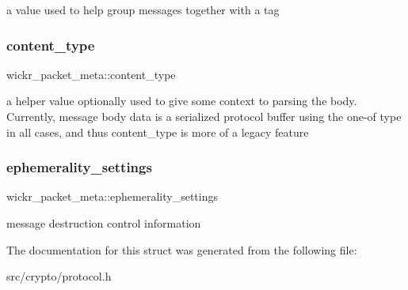 a value used to help group messages together with a tag \mbox{\label{structwickr__packet__meta_ada659f7c31d257c76edab5db52973f6e}} 
\subsubsection{\texorpdfstring{content\+\_\+type}{content\_type}}
{\footnotesize\ttfamily wickr\+\_\+packet\+\_\+meta\+::content\+\_\+type}

a helper value optionally used to give some context to parsing the body. Currently, message body data is a serialized protocol buffer using the one-\/of type in all cases, and thus content\+\_\+type is more of a legacy feature \mbox{\label{structwickr__packet__meta_a0ef43c179038ba036fc9db17976b8b1e}} 
\subsubsection{\texorpdfstring{ephemerality\+\_\+settings}{ephemerality\_settings}}
{\footnotesize\ttfamily wickr\+\_\+packet\+\_\+meta\+::ephemerality\+\_\+settings}

message destruction control information 

The documentation for this struct was generated from the following file\+:\begin{DoxyCompactItemize}
\item 
src/crypto/protocol.\+h\end{DoxyCompactItemize}
